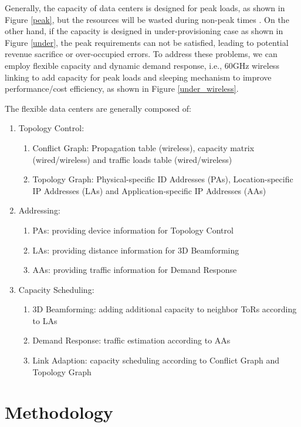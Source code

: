 \documentclass[journal,onecolumn,11pt]{IEEEtran}
\begin{document}
Generally, the capacity of data centers is designed for peak loads, as shown in Figure \ref{peak}, but the resources will be wasted during non-peak times \cite{Armbrust:2010:VCC:1721654.1721672}. On the other hand, if the capacity is designed in under-provisioning case as shown in Figure \ref{under}, the peak requirements can not be satisfied, leading to potential revenue sacrifice or over-occupied errors. To address these problems, we can employ flexible capacity and dynamic demand response, i.e., 60GHz wireless linking to add capacity for peak loads and sleeping mechanism to improve performance/cost efficiency, as shown in Figure \ref{under_wireless}.

The flexible data centers are generally composed of:
\begin{enumerate}
  \item Topology Control:
  \begin{enumerate}
    \item Conflict Graph: Propagation table (wireless), capacity matrix (wired/wireless) and traffic loads table (wired/wireless)
    \item Topology Graph: Physical-specific ID Addresses (PAs), Location-specific IP Addresses (LAs) and Application-specific IP Addresses (AAs)
  \end{enumerate}
  \item Addressing:
  \begin{enumerate}
    \item PAs: providing device information for Topology Control
    \item LAs: providing distance information for 3D Beamforming
    \item AAs: providing traffic information for Demand Response
  \end{enumerate}
  \item Capacity Scheduling:
  \begin{enumerate}
    \item 3D Beamforming: adding additional capacity to neighbor ToRs according to LAs
    \item Demand Response: traffic estimation according to AAs
    \item Link Adaption: capacity scheduling according to Conflict Graph and Topology Graph
  \end{enumerate}
\end{enumerate}

\section{Methodology}
\end{document}
